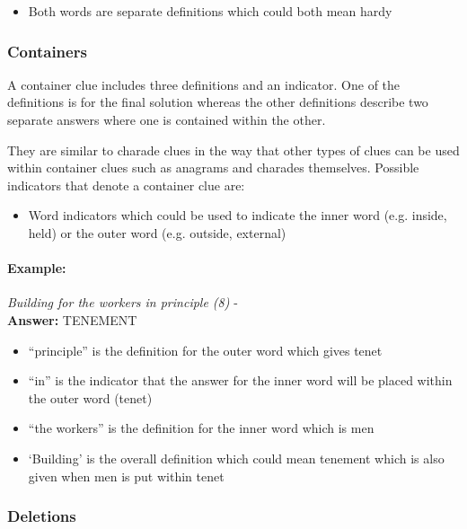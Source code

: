\begin{itemize}
  \item Both words are separate definitions which could both mean hardy 
\end{itemize}


\subsubsection{Containers}

A container clue includes three definitions and an indicator. One of the
definitions is for the final solution whereas the other definitions describe two
separate answers where one is contained within the other.

They are similar to charade clues in the way that other types of clues can be
used within container clues such as anagrams and charades themselves. Possible
indicators that denote a container clue are:

\begin{itemize} 
  \item Word indicators which could be used to indicate the inner word (e.g. 
        inside, held) or the outer word (e.g. outside, external)
\end{itemize}

\paragraph{Example:} \emph{Building for the workers in principle (8)} - \citep{shuchiContainers09} \\
\textbf{Answer:} TENEMENT 

\begin{itemize}
  \item ``principle'' is the definition for the outer word which gives tenet 
  \item ``in'' is the indicator that the answer for the inner word will be 
        placed within the outer word (tenet) 
  \item ``the workers'' is the definition for the inner word which is men 
  \item `Building' is the overall definition which could mean tenement which 
        is also given when men is put within tenet 
\end{itemize}


\subsubsection{Deletions}

